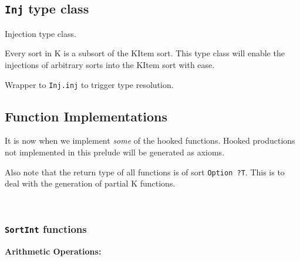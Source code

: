 \subsection{\texttt{Inj} type class}
\begin{definition}[Inj]\label{Inj}\leanok
Injection type class.

Every sort in K is a subsort of the KItem sort. This type class will enable the
injections of arbitrary sorts into the KItem sort with ease.
\end{definition}
\begin{definition}[inj]\label{inj}\leanok{}
Wrapper to \texttt{Inj.inj} to trigger type resolution.
\end{definition}

\subsection{Function Implementations}

It is now when we implement \textit{some} of the hooked functions.
Hooked productions not implemented in this prelude will be generated as axioms.

Also note that the return type of all functions is of sort \texttt{Option ?T}.
This is to deal with the generation of partial K functions.

\\
\subsubsection{\texttt{SortInt} functions}

\textbf{Arithmetic Operations:}

